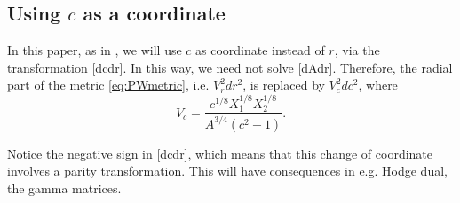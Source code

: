 \subsection{Using $c$ as a coordinate}

In this paper, as in \cite{Buchel:2000cn}, we will use $c$ as coordinate instead of $r$, via the transformation \eqref{dcdr}. 
In this way, we need not solve \eqref{dAdr}. 
Therefore, the radial part of the metric \eqref{eq:PWmetric}, i.e. $V_r^2 dr^2$, is replaced by $V_c^2 dc^2$, where
\begin{equation}
 V_c = \frac{c^{1/8}X_1^{1/8} X_2^{1/8}}{A^{3/4} (c^2-1)}.
\end{equation}

Notice the negative sign in \eqref{dcdr}, which means that this change of coordinate involves a parity transformation. This will have consequences in e.g. Hodge dual, the gamma matrices.





